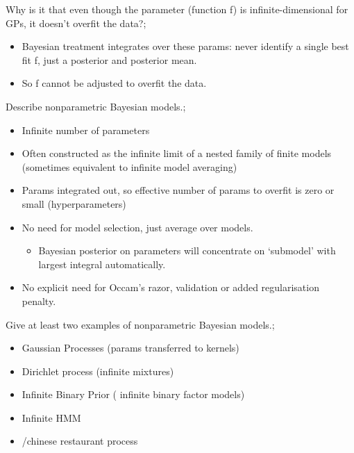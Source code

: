 \documentclass{article}
\begin{document}
Why is it that even though the parameter (function f) is infinite-dimensional for GPs, it doesn't overfit the data?; \begin{itemize}
    \item Bayesian treatment integrates over these params: never identify a single best fit f, just a posterior and posterior mean. 
    \item So f cannot be adjusted to overfit the data.
\end{itemize}

Describe nonparametric Bayesian models.; \begin{itemize}
    \item Infinite number of parameters
    \item Often constructed as the infinite limit of a nested family of finite models (sometimes equivalent to infinite model averaging)
    \item Params integrated out, so effective number of params to overfit is zero or small (hyperparameters)
    \item No need for model selection, just average over models. \begin{itemize}
        \item Bayesian posterior on parameters will concentrate on `submodel' with largest integral automatically.
    \end{itemize}
    \item No explicit need for Occam's razor, validation or added regularisation penalty.
\end{itemize}

Give at least two examples of nonparametric Bayesian models.; \begin{itemize}
    \item Gaussian Processes (params transferred to kernels)
    \item Dirichlet process (infinite mixtures)
    \item Infinite Binary Prior ( infinite binary factor models)
    \item Infinite HMM
    \item /chinese restaurant process
\end{itemize}
\end{document}
